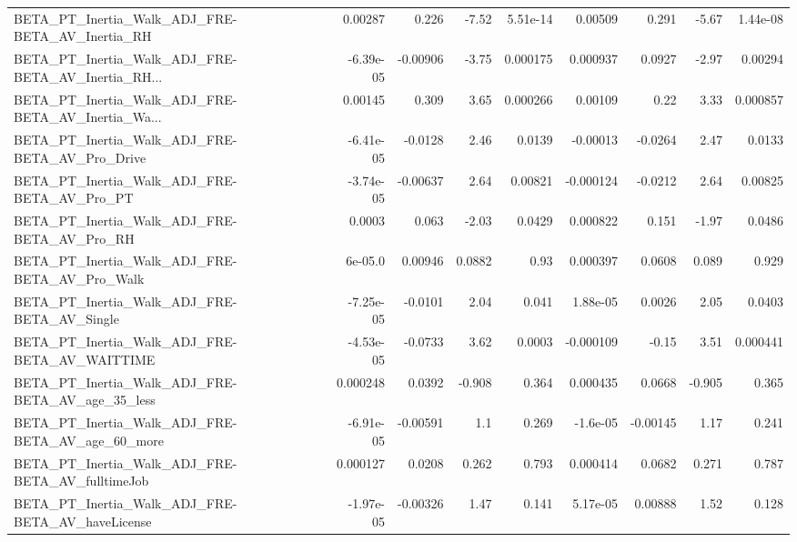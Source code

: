 \begin{tabular}{lrrrrrrrr}
BETA\_PT\_Inertia\_Walk\_ADJ\_FRE-BETA\_AV\_Inertia\_RH    &     0.00287 &        0.226 &    -7.52 & 5.51e-14 &    0.00509 &       0.291 &        -5.67 &      1.44e-08 \\
BETA\_PT\_Inertia\_Walk\_ADJ\_FRE-BETA\_AV\_Inertia\_RH... &   -6.39e-05 &     -0.00906 &    -3.75 & 0.000175 &   0.000937 &      0.0927 &        -2.97 &       0.00294 \\
BETA\_PT\_Inertia\_Walk\_ADJ\_FRE-BETA\_AV\_Inertia\_Wa... &     0.00145 &        0.309 &     3.65 & 0.000266 &    0.00109 &        0.22 &         3.33 &      0.000857 \\
BETA\_PT\_Inertia\_Walk\_ADJ\_FRE-BETA\_AV\_Pro\_Drive     &   -6.41e-05 &      -0.0128 &     2.46 &   0.0139 &   -0.00013 &     -0.0264 &         2.47 &        0.0133 \\
BETA\_PT\_Inertia\_Walk\_ADJ\_FRE-BETA\_AV\_Pro\_PT        &   -3.74e-05 &     -0.00637 &     2.64 &  0.00821 &  -0.000124 &     -0.0212 &         2.64 &       0.00825 \\
BETA\_PT\_Inertia\_Walk\_ADJ\_FRE-BETA\_AV\_Pro\_RH        &      0.0003 &        0.063 &    -2.03 &   0.0429 &   0.000822 &       0.151 &        -1.97 &        0.0486 \\
BETA\_PT\_Inertia\_Walk\_ADJ\_FRE-BETA\_AV\_Pro\_Walk      &     6e-05.0 &      0.00946 &   0.0882 &     0.93 &   0.000397 &      0.0608 &        0.089 &         0.929 \\
BETA\_PT\_Inertia\_Walk\_ADJ\_FRE-BETA\_AV\_Single        &   -7.25e-05 &      -0.0101 &     2.04 &    0.041 &   1.88e-05 &      0.0026 &         2.05 &        0.0403 \\
BETA\_PT\_Inertia\_Walk\_ADJ\_FRE-BETA\_AV\_WAITTIME      &   -4.53e-05 &      -0.0733 &     3.62 &   0.0003 &  -0.000109 &       -0.15 &         3.51 &      0.000441 \\
BETA\_PT\_Inertia\_Walk\_ADJ\_FRE-BETA\_AV\_age\_35\_less   &    0.000248 &       0.0392 &   -0.908 &    0.364 &   0.000435 &      0.0668 &       -0.905 &         0.365 \\
BETA\_PT\_Inertia\_Walk\_ADJ\_FRE-BETA\_AV\_age\_60\_more   &   -6.91e-05 &     -0.00591 &      1.1 &    0.269 &   -1.6e-05 &    -0.00145 &         1.17 &         0.241 \\
BETA\_PT\_Inertia\_Walk\_ADJ\_FRE-BETA\_AV\_fulltimeJob   &    0.000127 &       0.0208 &    0.262 &    0.793 &   0.000414 &      0.0682 &        0.271 &         0.787 \\
BETA\_PT\_Inertia\_Walk\_ADJ\_FRE-BETA\_AV\_haveLicense   &   -1.97e-05 &     -0.00326 &     1.47 &    0.141 &   5.17e-05 &     0.00888 &         1.52 &         0.128 \\

\end{tabular}
